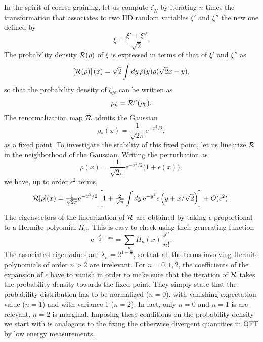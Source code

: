 \documentclass[12pt,here,feynmf]{article}
\begin{document}
In the spirit of coarse graining, let us compute $\zeta_{N}$ by iterating $n$ times the transformation that associates to two IID random variables $\xi'$ and $\xi''$ the new one defined by  
\begin{equation}
\xi=\frac{\xi'+\xi''}{\sqrt{2}}.
\end{equation}
The probability density ${\cal R}(\rho)$ of $\xi$ is expressed in terms of that of $\xi'$ and $\xi''$ as
\begin{equation}
\left[{\cal R}(\rho)\right](x)=\sqrt{2}\int dy\, \rho(y)\rho(\sqrt{2}x-y),
\end{equation}
so that the probability density of $\zeta_{N}$ can be written as
\begin{equation} 
\rho_{n}={\cal R}^{n}(\rho_{0}).
\end{equation}
The renormalization map ${\cal R}$ admits the Gaussian
\begin{equation}
\rho_{*}(x)=\textstyle{\frac{1}{\sqrt{2\pi}}}\mathrm{e}^{-x^{2}/2},
\end{equation}
as a fixed point. To investigate the stability of this fixed point, let us linearize ${\cal R}$ in the neighborhood of the Gaussian. Writing the perturbation as
\begin{equation}
\rho(x)=\textstyle{\frac{1}{\sqrt{2\pi}}}\mathrm{e}^{-x^{2}/2}
\Big(1+\epsilon(x)\Big),
\end{equation}
we have, up to order $\epsilon^{2}$ terms, 
\begin{equation}
{\cal R}[\rho](x)={\textstyle\frac{1}{\sqrt{2\pi}}}\mathrm{e}^{-x^{2}/2}\left[1+{\textstyle\frac{2}{\sqrt{\pi}}}
\int dy \,\mathrm{e}^{-y^{2}}\epsilon\left(y+x/\sqrt{2}\right)
\right]
+O(\epsilon^{2}).
\end{equation}
The eigenvectors of the linearization  of ${\cal R}$ are obtained by taking $\epsilon$ proportional to a Hermite polyomial $H_{n}$. This is easy to check using their generating function
\begin{equation}
\mathrm{e}^{-\frac{s^{2}}{2}+xs}=\sum_{n}H_{n}(x)\,\frac{s^{n}}{n!}.
\end{equation}
The associated eigenvalues are $\lambda_{n}=2^{1-\frac{n}{2}}$, so that all the terms involving Hermite polynomials of order $n>2$ are irrelevant. For $n=0,1,2$, the coefficients of the expansion of $\epsilon$  have to vanish in order to make sure that the iteration of ${\cal R}$ takes the probability density towards the fixed point. They simply state that the probability distribution has to be normalized ($n=0$), with vanishing expectation value ($n=1$) and with variance  1 ($n=2$). In fact, only $n=0$ and $n=1$ is are relevant, $n=2$ is marginal. Imposing these conditions on the probability density we start with is analogous to the fixing the otherwise divergent quantities in QFT by low energy measurements. 
\end{document}
